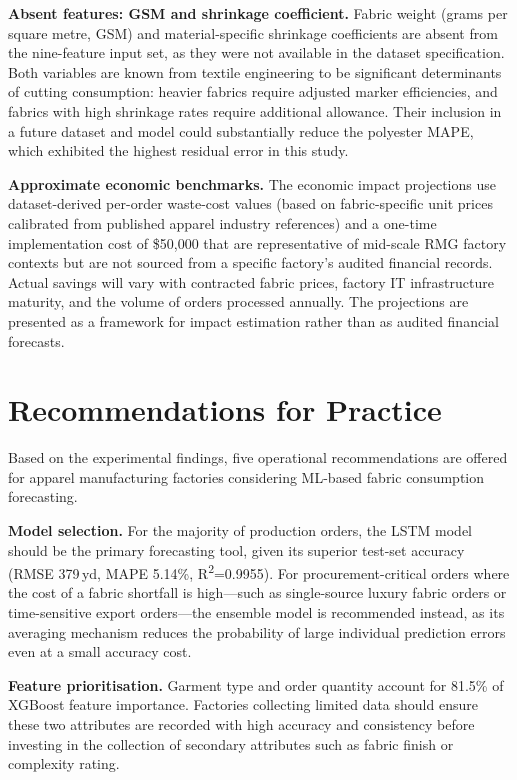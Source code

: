 \textbf{Absent features: GSM and shrinkage coefficient.} Fabric weight (grams per square metre, GSM) and material-specific shrinkage coefficients are absent from the nine-feature input set, as they were not available in the dataset specification. Both variables are known from textile engineering to be significant determinants of cutting consumption: heavier fabrics require adjusted marker efficiencies, and fabrics with high shrinkage rates require additional allowance. Their inclusion in a future dataset and model could substantially reduce the polyester MAPE, which exhibited the highest residual error in this study.

\textbf{Approximate economic benchmarks.} The economic impact projections use dataset-derived per-order waste-cost values (based on fabric-specific unit prices calibrated from published apparel industry references) and a one-time implementation cost of \$50{,}000 that are representative of mid-scale RMG factory contexts but are not sourced from a specific factory's audited financial records. Actual savings will vary with contracted fabric prices, factory IT infrastructure maturity, and the volume of orders processed annually. The projections are presented as a framework for impact estimation rather than as audited financial forecasts.

\secdiv
\section{Recommendations for Practice}
Based on the experimental findings, five operational recommendations are offered for apparel manufacturing factories considering ML-based fabric consumption forecasting.

\textbf{Model selection.} For the majority of production orders, the LSTM model should be the primary forecasting tool, given its superior test-set accuracy (RMSE 379\,yd, MAPE 5.14\%, R\textsuperscript{2}=0.9955). For procurement-critical orders where the cost of a fabric shortfall is high---such as single-source luxury fabric orders or time-sensitive export orders---the ensemble model is recommended instead, as its averaging mechanism reduces the probability of large individual prediction errors even at a small accuracy cost.

\textbf{Feature prioritisation.} Garment type and order quantity account for 81.5\% of XGBoost feature importance. Factories collecting limited data should ensure these two attributes are recorded with high accuracy and consistency before investing in the collection of secondary attributes such as fabric finish or complexity rating.


